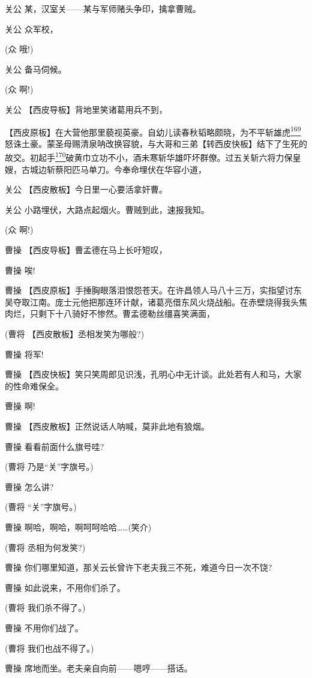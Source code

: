 关公 某，汉室关------某与军师赌头争印，擒拿曹贼。

关公 众军校，

(众 哦!)

关公 备马伺候。

(众 啊!)

关公 【西皮导板】背地里笑诸葛用兵不到，

【西皮原板】在大营他那里藐视英豪。自幼儿读春秋韬略颇晓，为不平斩雄虎\protect\hyperlink{fn169}{\textsuperscript{169}}怒诛土豪。蒙圣母赐清泉呐改换容貌，与大哥和三弟【转西皮快板】结下了生死的故交。初起手\protect\hyperlink{fn170}{\textsuperscript{170}}破黄巾立功不小，酒未寒斩华雄吓坏群僚。过五关斩六将力保皇嫂，古城边斩蔡阳匹马单刀。今奉命埋伏在华容小道，

关公 【西皮散板】今日里一心要活拿奸曹。

关公 小路埋伏，大路点起烟火。曹贼到此，速报我知。

(众 啊!)

曹操 【西皮导板】曹孟德在马上长吁短叹，

曹操 唉!

曹操
【西皮原板】手捶胸眼落泪恨怨苍天。在许昌领人马八十三万，实指望讨东吴夺取江南。庞士元他把那连环计献，诸葛亮借东风火烧战船。在赤壁烧得我头焦肉烂，只剩下十八骑好不惨然。曹孟德勒丝缰喜笑满面，

(曹将 【西皮散板】丞相发笑为哪般?)

曹操 将军!

曹操
【西皮快板】笑只笑周郎见识浅，孔明心中无计谈。此处若有人和马，大家的性命难保全。

曹操 啊!

曹操 【西皮散板】正然说话人呐喊，莫非此地有狼烟。

曹操 看看前面什么旗号哇?

(曹将 乃是``关''字旗号。)

曹操 怎么讲?

(曹将 ``关''字旗号。)

曹操 啊哈，啊哈，啊呵呵哈哈\ldots{}\ldots{}(笑介)

(曹将 丞相为何发笑?)

曹操 你们哪里知道，那关云长曾许下老夫我三不死，难道今日一次不饶?

曹操 如此说来，不用你们杀了。

(曹将 我们杀不得了。)

曹操 不用你们战了。

(曹将 我们也战不得了。)

曹操 席地而坐。老夫亲自向前------嗯哼------搭话。

